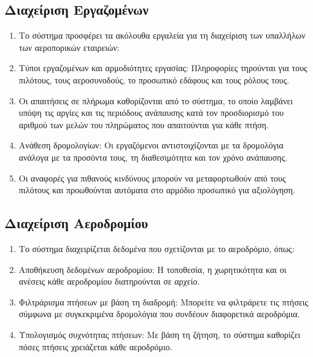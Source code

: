 \documentclass{article}
\begin{document}
	\subsection{Διαχείριση Εργαζομένων}
	\begin{enumerate}
		\item Το σύστημα προσφέρει τα ακόλουθα εργαλεία για τη διαχείριση των υπαλλήλων των αεροπορικών εταιρειών:
		\item Τύποι εργαζομένων και αρμοδιότητες εργασίας: Πληροφορίες τηρούνται για τους πιλότους, τους αεροσυνοδούς, το προσωπικό εδάφους και τους ρόλους τους.
		\item Οι απαιτήσεις σε πλήρωμα καθορίζονται από το σύστημα, το οποίο λαμβάνει υπόψη τις αργίες και τις περιόδους ανάπαυσης κατά τον προσδιορισμό του αριθμού των μελών του πληρώματος που απαιτούνται για κάθε πτήση.
		\item Ανάθεση δρομολογίων: Οι εργαζόμενοι αντιστοιχίζονται με τα δρομολόγια ανάλογα με τα προσόντα τους, τη διαθεσιμότητα και τον χρόνο ανάπαυσης.
		\item Οι αναφορές για πιθανούς κινδύνους μπορούν να μεταφορτωθούν από τους πιλότους και προωθούνται αυτόματα στο αρμόδιο προσωπικό για αξιολόγηση.
	\end{enumerate}
	
	\subsection{Διαχείριση Αεροδρομίου}
	\begin{enumerate}
		\item Το σύστημα διαχειρίζεται δεδομένα που σχετίζονται με το αεροδρόμιο, όπως:
		\item Αποθήκευση δεδομένων αεροδρομίου: Η τοποθεσία, η χωρητικότητα και οι ανέσεις κάθε αεροδρομίου διατηρούνται σε αρχείο.
		\item Φιλτράρισμα πτήσεων με βάση τη διαδρομή: Μπορείτε να φιλτράρετε τις πτήσεις σύμφωνα με συγκεκριμένα δρομολόγια που συνδέουν διαφορετικά αεροδρόμια.
		\item Υπολογισμός συχνότητας πτήσεων: Με βάση τη ζήτηση, το σύστημα καθορίζει πόσες πτήσεις χρειάζεται κάθε αεροδρόμιο.
	\end{enumerate}
	
\end{document}
